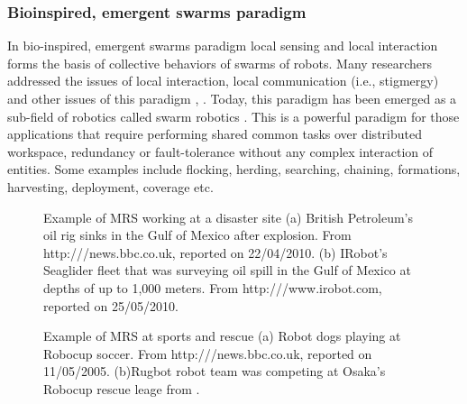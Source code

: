 \subsubsection*{Bioinspired, emergent swarms paradigm}
In bio-inspired, emergent swarms paradigm local sensing and local interaction forms the basis of collective behaviors of swarms of robots. Many researchers addressed the issues of local interaction, local communication (i.e., stigmergy) and other issues of this paradigm \cite{Mataric1995}, \cite{Kube+1993}. Today, this paradigm has been emerged as a sub-field of robotics called swarm robotics \cite{Sahin+2005}. This is a powerful paradigm for those applications that require performing shared common tasks over distributed workspace, redundancy or fault-tolerance without any complex interaction of entities. Some examples include flocking, herding, searching, chaining, formations, harvesting, deployment, coverage etc. \\
\begin{figure}
\centering
{} 
\hspace{0.25cm}
\caption{Example of MRS working at a disaster site (a) British Petroleum's oil rig sinks in the Gulf of Mexico after explosion. From http:///news.bbc.co.uk, reported on 22/04/2010. 
 (b) IRobot's Seaglider fleet that was surveying oil spill in the Gulf of Mexico at depths of up to 1,000 meters. From http:///www.irobot.com, reported on 25/05/2010.}
\label{fig:bp-oil-spill}
\end{figure}
\begin{figure}
\centering
{} 
\hspace{0.25cm}
\caption{Example of MRS at sports and rescue (a) Robot dogs playing at Robocup soccer. From http:///news.bbc.co.uk, reported on 11/05/2005. 
 (b)Rugbot robot  team was competing at Osaka's Robocup rescue leage from \protect{}.}
\label{fig:robocup}
\end{figure}
